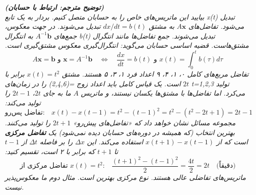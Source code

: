 \documentclass[12pt, a4paper]{book}
\begin{document}
	\vspace{5mm}
	\textit{\textbf{(توضیح مترجم: ارتباط با حسابان)} \\
		بیایید این ماتریس‌های خاص را به حسابان متصل کنیم. بردار  به یک تابع x(t) تبدیل می‌شود. تفاضل‌های $A\mathbf{x}$ به مشتق $dx/dt = b(t)$ تبدیل می‌شوند. در جهت معکوس، جمع‌های $A^{-1}\mathbf{b}$ به انتگرال b(t) تبدیل می‌شوند. جمع تفاضل‌ها مانند انتگرال مشتق‌هاست.
		قضیه اساسی حسابان می‌گوید: انتگرال‌گیری معکوس مشتق‌گیری است.
		\begin{equation}
			A\mathbf{x}=\mathbf{b} \text{ و } \mathbf{x}=A^{-1}\mathbf{b} \quad \iff \quad \frac{dx}{dt}=b(t) \text{ و } x(t) = \int_0^t b(\tau)d\tau
		\end{equation}
		تفاضل مربع‌های کامل ۰، ۱، ۴، ۹ اعداد فرد ۱، ۳، ۵ هستند. مشتق $x(t)=t^2$ برابر با $2t$ است. یک قیاس کامل باید اعداد زوج =(2,4,6) را در زمان‌های t=1,2,3 تولید می‌کرد. اما تفاضل‌ها با مشتق‌ها یکسان نیستند، و ماتریس $A$ ما به جای $2t$، $2t-1$ را تولید می‌کند:
		\begin{equation}
			\textbf{تفاضل پس‌رو:} \quad x(t) - x(t-1) = t^2 - (t-1)^2 = t^2 - (t^2 - 2t + 1) = 2t-1
		\end{equation}
		مجموعه مسائل نشان خواهد داد که «تفاضل‌های پیش‌رو» $2t+1$ را تولید می‌کنند. بهترین انتخاب (که همیشه در دوره‌های حسابان دیده نمی‌شود) یک \textbf{تفاضل مرکزی} است که از $x(t+1)-x(t-1)$ استفاده می‌کند. این $\Delta x$ را بر فاصله $\Delta t$ از $t-1$ تا $t+1$ که برابر با ۲ است، تقسیم کنید:
		\begin{equation}
			\textbf{تفاضل مرکزی از $x(t)=t^2$:} \quad \frac{(t+1)^2 - (t-1)^2}{2} = \frac{4t}{2} = 2t \quad \text{(دقیقاً)}
		\end{equation}
		ماتریس‌های تفاضلی عالی هستند. نوع مرکزی بهترین است. مثال دوم ما معکوس‌پذیر نیست.}
	
\end{document}
